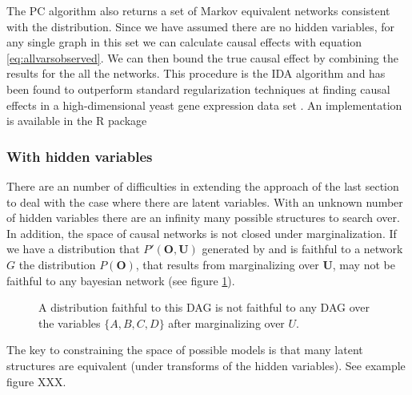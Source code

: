 \documentclass[11pt,a4paper]{article}
\begin{document}
The PC algorithm also returns a set of Markov equivalent networks consistent with the distribution. Since we have assumed there are no hidden variables, for any single graph in this set we can calculate causal effects with equation \ref{eq:allvarsobserved}. We can then bound the true causal effect by combining the results for the all the networks. This procedure is the IDA algorithm \cite{Maathuis2009} and has been found to outperform standard regularization techniques at finding causal effects in a high-dimensional yeast gene expression data set \cite{Maathuis2010}. An implementation is available in the R package \cite{Kalisch2012} 


\subsubsection{With hidden variables}
There are an number of difficulties in extending the approach of the last section to deal with the case where there are latent variables. With an unknown number of hidden variables there are an infinity many possible structures to search over. In addition, the space of causal networks is not closed under marginalization. If we have a distribution that $P'(\boldsymbol{O},\boldsymbol{U})$ generated by and is faithful to a network $G$ the distribution $P(\boldsymbol{O})$, that results from marginalizing over $\boldsymbol{U}$, may not be faithful to any bayesian network (see figure \ref{fig:DAGSnotclosed}).

\begin{figure}
\centering
\caption{A distribution faithful to this DAG is not faithful to any DAG over the variables $\{A,B,C,D\}$ after marginalizing over $U$. }
\label{fig:DAGSnotclosed}

\end{figure}
 

The key to constraining the space of possible models is that many latent structures are equivalent (under transforms of the hidden variables). See example figure XXX.
\end{document}
